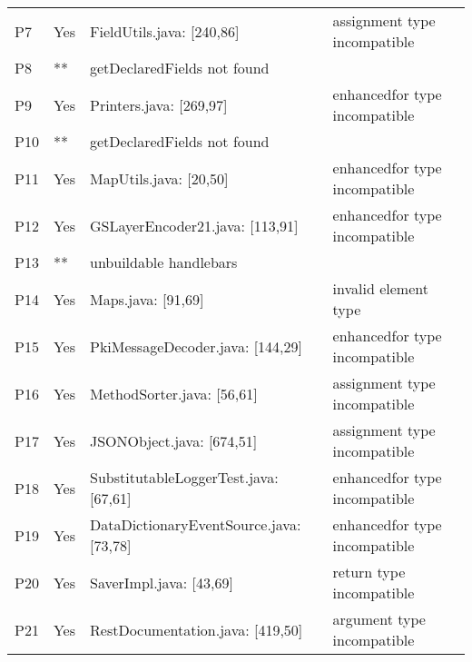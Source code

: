 \begin{table}[]
\begin{tabular}{|p{1.5cm}|p{1cm}|p{5cm}|p{5cm}|}
        P7 & Yes & FieldUtils.java: [240,86] & assignment type incompatible  \\
        P8 & ** & getDeclaredFields not found &   \\
        P9 & Yes & Printers.java: [269,97]  &  enhancedfor type incompatible \\
        P10 & ** & getDeclaredFields not found  &  \\
        P11 & Yes & MapUtils.java: [20,50]   & enhancedfor type incompatible  \\
        P12 & Yes  & GSLayerEncoder21.java: [113,91]  & enhancedfor type incompatible \\
        P13 & ** & unbuildable handlebars &  \\
        P14 & Yes  & Maps.java: [91,69] & invalid element type   \\
        P15 & Yes & PkiMessageDecoder.java: [144,29]  &  enhancedfor type incompatible  \\
        P16 & Yes & MethodSorter.java: [56,61]  & assignment type incompatible  \\
        P17 & Yes & JSONObject.java: [674,51]  & assignment type incompatible  \\
        P18 & Yes & SubstitutableLoggerTest.java: [67,61]   & enhancedfor type incompatible  \\
        P19 & Yes & DataDictionaryEventSource.java: [73,78]  &  enhancedfor type incompatible  \\
        P20 & Yes & SaverImpl.java: [43,69]  &  return type incompatible  \\
        P21 & Yes & RestDocumentation.java: [419,50] &  argument type incompatible   \\ \hline
    \end{tabular}
\end{table}


